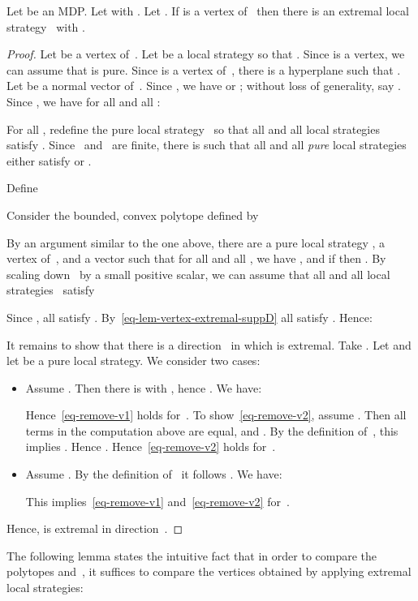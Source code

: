 \begin{lem}\label{lem-vertex-extremal}
Let  be an MDP\@.
Let  with .
Let .
If  is a vertex of~ then there is an extremal local strategy~ with .
\end{lem}
\begin{proof}
Let  be a vertex of~.
Let  be a local strategy so that .
Since  is a vertex, we can assume that  is pure.
Since  is a vertex of~, there is a hyperplane  such that .
Let  be a normal vector of~.
Since , we have  or ; without loss of generality, say .
Since , we have for all  and all :


For all , redefine the pure local strategy~ so that all  and all local strategies~ satisfy .
Since ~and~ are finite, there is  such that all  and all \emph{pure} local strategies~  either satisfy  or .

Define

Consider the bounded, convex polytope  defined by

By an argument similar to the one above, there are a pure local strategy , a vertex  of~, and a vector  such that for all  and all , we have , and if  then .
By scaling down~ by a small positive scalar, we can assume that all  and all local strategies~ satisfy


Since , all  satisfy .
By~\eqref{eq-lem-vertex-extremal-suppD} all  satisfy .
Hence:


It remains to show that there is a direction~ in which  is extremal.
Take .
Let  and let  be a pure local strategy.
We consider two cases:
\begin{itemize}
\item
Assume .
Then there is  with , hence .
We have:

Hence~\eqref{eq-remove-v1} holds for~.
To show~\eqref{eq-remove-v2}, assume .
Then all terms in the computation above are equal, and .
By the definition of~, this implies .
Hence .
Hence~\eqref{eq-remove-v2} holds for~.
\item
Assume .
By the definition of~ it follows .
We have:

This implies~\eqref{eq-remove-v1} and~\eqref{eq-remove-v2} for~.
\end{itemize}
Hence,  is extremal in direction~.
\end{proof}

The following lemma states the intuitive fact that in order to compare the polytopes  and~, it suffices to compare the vertices obtained by applying extremal local strategies:

